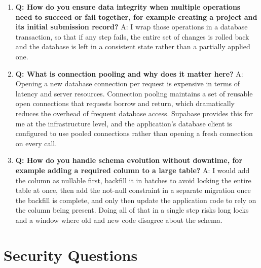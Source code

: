 \documentclass[11pt,a4paper]{report}
\begin{document}
\begin{enumerate}[leftmargin=*]
\item \textbf{Q: How do you ensure data integrity when multiple operations need to succeed or fail together, for example creating a project and its initial submission record?}
A: I wrap those operations in a database transaction, so that if any step fails, the entire set of changes is rolled back and the database is left in a consistent state rather than a partially applied one.

\item \textbf{Q: What is connection pooling and why does it matter here?}
A: Opening a new database connection per request is expensive in terms of latency and server resources. Connection pooling maintains a set of reusable open connections that requests borrow and return, which dramatically reduces the overhead of frequent database access. Supabase provides this for me at the infrastructure level, and the application's database client is configured to use pooled connections rather than opening a fresh connection on every call.

\item \textbf{Q: How do you handle schema evolution without downtime, for example adding a required column to a large table?}
A: I would add the column as nullable first, backfill it in batches to avoid locking the entire table at once, then add the not-null constraint in a separate migration once the backfill is complete, and only then update the application code to rely on the column being present. Doing all of that in a single step risks long locks and a window where old and new code disagree about the schema.
\end{enumerate}

\section{Security Questions}
\end{document}
